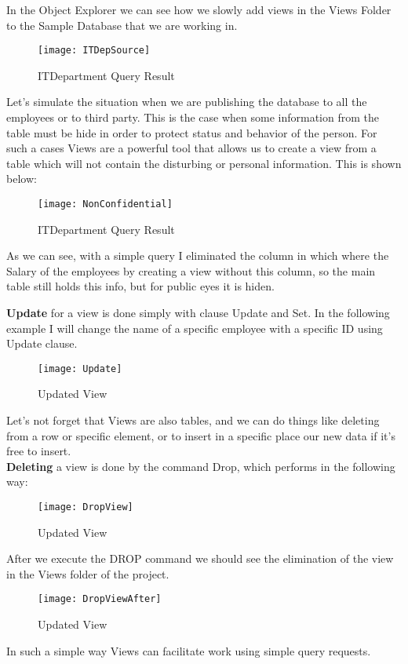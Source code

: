 In the Object Explorer we can see how we slowly add views in the Views Folder to the Sample Database that we are working in.
\begin{figure}[ht!]
    \centering
    \texttt{[image: ITDepSource]}
    \caption{ITDepartment Query Result}
    \label{fig_21}
\end{figure}

Let's simulate the situation when we are publishing the database to all the employees or to third party. This is the case when some information from the table must be hide in order to protect status and behavior of the person.
For such a cases Views are a powerful tool that allows us to create a view from a table which will not contain the disturbing or personal information.
This is shown below:\\
\begin{figure}[ht!]
    \centering
    \texttt{[image: NonConfidential]}
    \caption{ITDepartment Query Result}
    \label{fig_21}
\end{figure}
As we can see, with a simple query I eliminated the column in which where the Salary of the employees by creating a view without this column, so the main table still holds this info, but for public eyes it is hiden.

\textbf{Update} for a view is done simply with clause Update and Set. In the following example I will change the name of a specific employee with a specific ID using Update clause. 
\begin{figure}[ht!]
    \centering
    \texttt{[image: Update]}
    \caption{Updated View}
    \label{fig_21}
\end{figure}

Let's not forget that Views are also tables, and we can do things like deleting from a row or specific element, or to insert in a specific place our new data if it's free to insert.\\
\textbf{Deleting} a view is done by the command Drop, which performs in the following way:\\

\begin{figure}[ht!]
    \centering
    \texttt{[image: DropView]}
    \caption{Updated View}
    \label{fig_21}
\end{figure}

After we execute the DROP command we should see the elimination of the view in the Views folder of the project.\\
\begin{figure}[ht!]
    \centering
    \texttt{[image: DropViewAfter]}
    \caption{Updated View}
    \label{fig_21}
\end{figure}

In such a simple way Views can facilitate work using simple query requests.
\clearpage